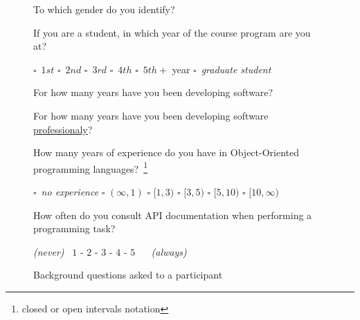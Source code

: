 \begin{figure}[h!]
\begin{mdframed}[backgroundcolor=gray!15] 
\begin{scriptsize}

\noindent To which gender do you identify? 

\medskip

\noindent If you are a student, in which year of the course program are you at?  \smallskip

\quad $\square$~$1st$  
\quad $\square$~$2nd$  
\quad $\square$~$3rd$  
\quad $\square$~$4th$  
\quad $\square$~$5th+$ year 
\quad $\square$~\textit{graduate student} 

\medskip

\noindent For how many years have you been developing software?  

\medskip

\noindent For how many years have you been developing software \underline{professionaly}? 

\medskip

\noindent How many years of experience do you have in Object-Oriented programming languages?~\footnote{\scriptsize closed or open intervals notation} \smallskip

\quad $\square$~\textit{no experience} 
\quad $\square$ $(\infty, 1)$
\quad $\square$ $[1, 3)$
\quad $\square$ $[3, 5)$
\quad $\square$ $[5, 10)$
\quad $\square$ $[10, \infty)$

\medskip

\noindent How often do you consult API documentation when performing a programming task?  \smallskip

\quad \textit{(never)} ~$1$ - $2$ - $3$ - $4$ - $5$ ~ ~\textit{(always)} 

\end{scriptsize}
\end{mdframed}
\caption{Background questions asked to a participant}
\label{fig:experiment-demographics}
\end{figure}

    
